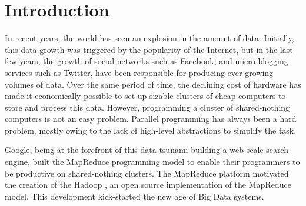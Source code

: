 \chapter{Introduction}
\label{ch:intro}

In recent years, the world has seen an explosion in the amount of data. Initially, this data growth was triggered by the popularity of the Internet, but in the last few years, the growth of social networks such as Facebook, and micro-blogging services such as Twitter, have been responsible for producing ever-growing volumes of data. Over the same period of time, the declining cost of hardware has made it economically possible to set up sizable clusters of cheap computers to store and process this data. However, programming a cluster of shared-nothing computers is not an easy problem. Parallel programming has always been a hard problem, mostly owing to the lack of high-level abstractions to simplify the task.

Google, being at the forefront of this data-tsunami building a web-scale search engine, built the MapReduce \cite{mapreduce} programming model to enable their programmers to be productive on shared-nothing clusters. The MapReduce platform motivated the creation of the Hadoop \cite{hadoop:website}, an open source implementation of the MapReduce model. This development kick-started the new age of Big Data systems.

